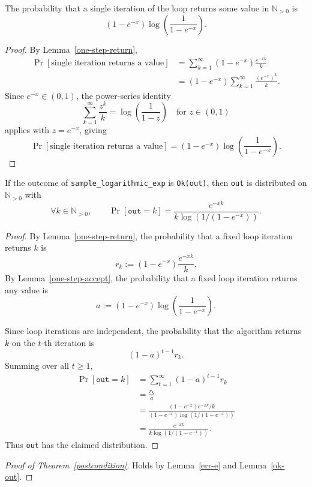 \documentclass{article}
\begin{document}
\begin{lemma}
\label{one-step-accept}
The probability that a single iteration of the loop returns some value in $\mathbb{N}_{>0}$ is
\[
(1 - e^{-x}) \log\!\left(\frac{1}{1 - e^{-x}}\right).
\]
\end{lemma}

\begin{proof}
By Lemma~\ref{one-step-return},
\begin{align*}
\Pr[\text{single iteration returns a value}]
&= \sum_{k=1}^{\infty} (1 - e^{-x}) \frac{e^{-xk}}{k} \\
&= (1 - e^{-x}) \sum_{k=1}^{\infty} \frac{(e^{-x})^k}{k}.
\end{align*}
Since $e^{-x} \in (0, 1)$, the power-series identity
\[
\sum_{k=1}^{\infty} \frac{z^k}{k} = \log\!\left(\frac{1}{1-z}\right)
\quad \text{for } z \in (0, 1)
\]
applies with $z = e^{-x}$, giving
\[
\Pr[\text{single iteration returns a value}]
=
(1 - e^{-x}) \log\!\left(\frac{1}{1 - e^{-x}}\right).
\]
\end{proof}

\begin{lemma}
\label{ok-out}
If the outcome of \texttt{sample\_logarithmic\_exp} is \texttt{Ok(out)}, then \texttt{out} is distributed on $\mathbb{N}_{>0}$ with
\[
\forall k \in \mathbb{N}_{>0}, \qquad
\Pr[\texttt{out} = k]
=
\frac{e^{-xk}}{k \log(1 / (1 - e^{-x}))}.
\]
\end{lemma}

\begin{proof}
By Lemma~\ref{one-step-return}, the probability that a fixed loop iteration returns $k$ is
\[
r_k := (1 - e^{-x}) \frac{e^{-xk}}{k}.
\]
By Lemma~\ref{one-step-accept}, the probability that a fixed loop iteration returns any value is
\[
a := (1 - e^{-x}) \log\!\left(\frac{1}{1 - e^{-x}}\right).
\]

Since loop iterations are independent, the probability that the algorithm returns $k$ on the
$t$-th iteration is
\[
(1-a)^{t-1} r_k.
\]
Summing over all $t \ge 1$,
\begin{align*}
\Pr[\texttt{out} = k]
&= \sum_{t=1}^{\infty} (1-a)^{t-1} r_k \\
&= \frac{r_k}{a} \\
&= \frac{(1 - e^{-x}) e^{-xk}/k}{(1 - e^{-x}) \log(1 / (1 - e^{-x}))} \\
&= \frac{e^{-xk}}{k \log(1 / (1 - e^{-x}))}.
\end{align*}
Thus \texttt{out} has the claimed distribution.
\end{proof}

\begin{proof}[Proof of Theorem~\ref{postcondition}]
Holds by Lemma~\ref{err-e} and Lemma~\ref{ok-out}.
\end{proof}



\end{document}

